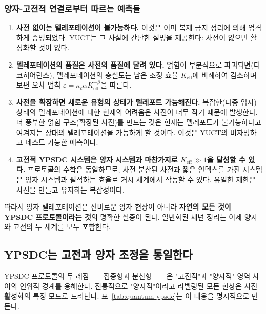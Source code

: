 \documentclass[12pt,a4paper]{article}
\begin{document}
	\subsubsection*{양자-고전적 연결로부터 따르는 예측들}
	
	\begin{enumerate}
		\item \textbf{사전 없이는 텔레포테이션이 불가능하다.} 이것은 이미 복제 금지 정리에 의해 엄격하게 증명되었다. YUCT는 그 사실에 간단한 설명을 제공한다: 사전이 없으면 활성화할 것이 없다.
		\item \textbf{텔레포테이션의 품질은 사전의 품질에 달려 있다.} 얽힘이 부분적으로 파괴되면(디코히어런스), 텔레포테이션의 충실도는 남은 조정 효율 $K_{\mathrm{eff}}$에 비례하여 감소하며 보편 오차 법칙 $\varepsilon = \kappa_c \alpha K_{\mathrm{eff}}^{-\beta}$을 따른다.
		\item \textbf{사전을 확장하면 새로운 유형의 상태가 텔레포트 가능해진다.} 복잡한(다중 입자) 상태의 텔레포테이션에 대한 현재의 어려움은 사전이 너무 작기 때문에 발생한다. 더 풍부한 얽힘 구조(확장된 사전)를 만드는 것은 현재는 텔레포트가 불가능하다고 여겨지는 상태의 텔레포테이션을 가능하게 할 것이다. 이것은 YUCT의 비자명하고 테스트 가능한 예측이다.
		\item \textbf{고전적 YPSDC 시스템은 양자 시스템과 마찬가지로 $K_{\mathrm{eff}} \gg 1$을 달성할 수 있다.} 프로토콜의 수학은 동일하므로, 사전 분산된 사전과 짧은 인덱스를 가진 시스템은 양자 시스템과 필적하는 효율로 거시 세계에서 작동할 수 있다. 유일한 제한은 사전을 만들고 유지하는 복잡성이다.
	\end{enumerate}
	
	따라서 양자 텔레포테이션은 신비로운 양자 현상이 아니라 \textbf{자연의 모든 것이 YPSDC 프로토콜이라는 것}의 명확한 실증이 된다. 일반화된 섀넌 정리는 이제 양자와 고전의 두 세계를 모두 포함한다.
	
	\subsection{YPSDC는 고전과 양자 조정을 통일한다}
	\label{subsec:unified-table}
	
	YPSDC 프로토콜의 두 레짐——집중형과 분산형——은 "고전적"과 "양자적" 영역 사이의 인위적 경계를 용해한다. 전통적으로 "양자적"이라고 라벨링된 모든 현상은 사전 활성화의 특정 모드로 드러난다. 표~\ref{tab:quantum-ypsdc}는 이 대응을 명시적으로 만든다.
	
\end{document}
